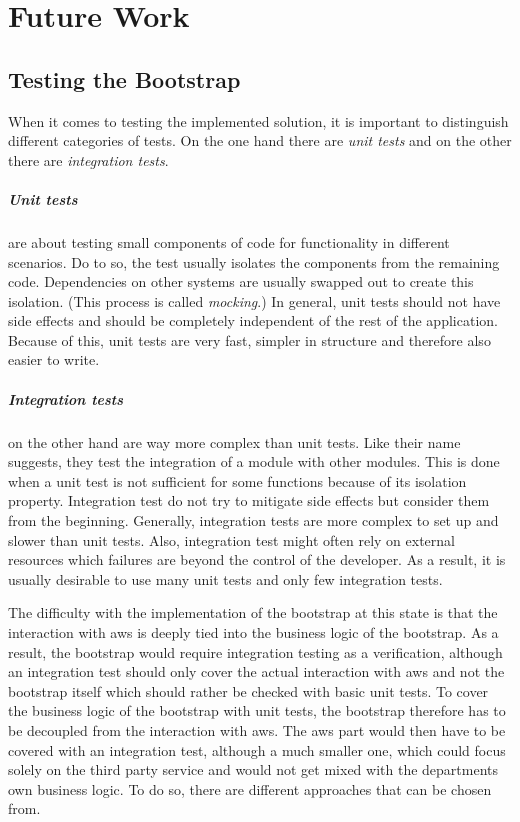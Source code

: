 \chapter{Future Work}
\section{Testing the Bootstrap}
When it comes to testing the implemented solution, it is important to distinguish different categories of tests.
On the one hand there are \emph{unit tests} and on the other there are \emph{integration tests}.

\paragraph{Unit tests} are about testing small components of code for functionality in different scenarios.
Do to so, the test usually isolates the components from the remaining code.
Dependencies on other systems are usually swapped out to create this isolation.
(This process is called \emph{mocking}.)
In general, unit tests should not have side effects and should be completely independent of the rest of the application.
Because of this, unit tests are very fast, simpler in structure and therefore also easier to write.

\paragraph{Integration tests} on the other hand are way more complex than unit tests.
Like their name suggests, they test the integration of a module with other modules.
This is done when a unit test is not sufficient for some functions because of its isolation property.
Integration test do not try to mitigate side effects but consider them from the beginning.
Generally, integration tests are more complex to set up and slower than unit tests.
Also, integration test might often rely on external resources which failures are beyond the control of the developer.
As a result, it is usually desirable to use many unit tests and only few integration tests.

The difficulty with the implementation of the bootstrap at this state is that the interaction with \ac{aws} is deeply tied into the business logic of the bootstrap.
As a result, the bootstrap would require integration testing as a verification, although an integration test should only cover the actual interaction with \ac{aws} and not the bootstrap itself which should rather be checked with basic unit tests.
To cover the business logic of the bootstrap with unit tests, the bootstrap therefore has to be decoupled from the interaction with \ac{aws}.
The \ac{aws} part would then have to be covered with an integration test, although a much smaller one, which could focus solely on the third party service and would not get mixed with the departments own business logic.
To do so, there are different approaches that can be chosen from.

